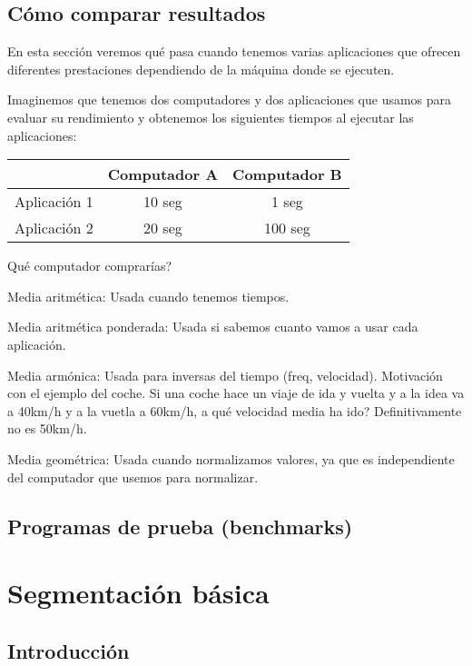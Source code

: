 \documentclass[12pt,onecolumn]{memoir}
\begin{document}
\section{Cómo comparar resultados}

En esta sección veremos qué pasa cuando tenemos varias aplicaciones
que ofrecen diferentes prestaciones dependiendo de la máquina donde se
ejecuten.

Imaginemos que tenemos dos computadores y dos aplicaciones que usamos
para evaluar su rendimiento y obtenemos los siguientes tiempos al
ejecutar las aplicaciones:

\begin{center}
\begin{tabular}{ccc}
\hline
  & Computador A & Computador B \\ 
\hline
 Aplicación 1 & 10 seg & 1 seg \\  
 Aplicación 2 & 20 seg & 100 seg \\
 \hline
\end{tabular}
\end{center}

Qué computador comprarías?

Media aritmética: Usada cuando tenemos tiempos.

Media aritmética ponderada: Usada si sabemos cuanto vamos a usar cada aplicación.

Media armónica: Usada para inversas del tiempo (freq, velocidad). Motivación con el ejemplo del coche. Si una coche hace un viaje de ida y vuelta y a la idea va a 40km/h y a la vuetla a 60km/h, a qué velocidad media ha ido? Definitivamente no es 50km/h.
       	 

Media geométrica: Usada cuando normalizamos valores, ya que es independiente del computador que usemos para normalizar.

\section{Programas de prueba (benchmarks)}



\chapter{Segmentación básica}
\label{cap:segmentado}


\section{Introducción}
\label{sec:introduccion_segmentado}
\end{document}
